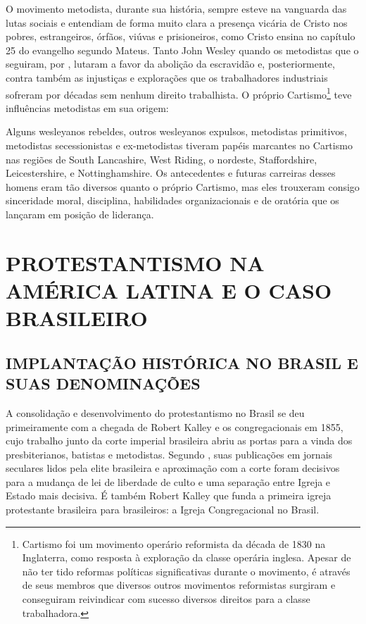 \documentclass[
    article,            %
	12pt,				%
	oneside,			%
	a4paper,			%
	chapter=TITLE,		%
	section=TITLE,		%
	english,			%
	french,				%
	spanish,			%
	brazil				%
	]{abntex2}
\begin{document}
O movimento metodista, durante sua história, sempre esteve na vanguarda das lutas sociais e entendiam de forma muito clara a presença vicária de Cristo nos pobres, estrangeiros, órfãos, viúvas e prisioneiros, como Cristo ensina no capítulo 25 do evangelho segundo Mateus. Tanto John Wesley quando os metodistas que o seguiram, por , lutaram a favor da abolição da escravidão e, posteriormente, contra também as injustiças e explorações que os trabalhadores industriais sofreram por décadas sem nenhum direito trabalhista. O próprio Cartismo\footnote{Cartismo foi um movimento operário reformista da década de 1830 na Inglaterra, como resposta à exploração da classe operária inglesa. Apesar de não ter tido reformas políticas significativas durante o movimento, é através de seus membros que diversos outros movimentos reformistas surgiram e conseguiram reivindicar com sucesso diversos direitos para a classe trabalhadora.} teve influências metodistas em sua origem:
\begin{citacao}
Alguns wesleyanos rebeldes, outros wesleyanos expulsos, metodistas primitivos, metodistas secessionistas e ex-metodistas tiveram papéis marcantes no Cartismo nas regiões de South Lancashire, West Riding, o nordeste, Staffordshire, Leicestershire, e Nottinghamshire. Os antecedentes e futuras carreiras desses homens eram tão diversos quanto o próprio Cartismo, mas eles trouxeram consigo sinceridade moral, disciplina, habilidades organizacionais e de oratória que os lançaram em posição de liderança. \cite[p.106, tradução nossa]{HEMPTON}
\end{citacao}

\section{PROTESTANTISMO NA AMÉRICA LATINA E O CASO BRASILEIRO}
\subsection{IMPLANTAÇÃO HISTÓRICA NO BRASIL E SUAS DENOMINAÇÕES}
A consolidação e desenvolvimento do protestantismo no Brasil se deu primeiramente com a chegada de Robert Kalley e os congregacionais em 1855, cujo trabalho junto da corte imperial brasileira abriu as portas para a vinda dos presbiterianos, batistas e metodistas. Segundo , suas publicações em jornais seculares lidos pela elite brasileira e aproximação com a corte foram decisivos para a mudança de lei de liberdade de culto e uma separação entre Igreja e Estado mais decisiva. É também Robert Kalley que funda a primeira igreja protestante brasileira para brasileiros: a Igreja Congregacional no Brasil.
\end{document}
